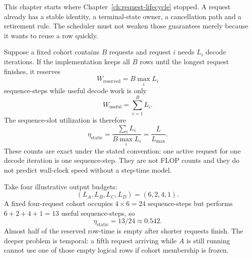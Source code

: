 This chapter starts where Chapter~\ref{ch:request-lifecycle} stopped. A request
already has a stable identity, a terminal-state owner, a cancellation path and
a retirement rule. The scheduler must not weaken those guarantees merely
because it wants to reuse a row quickly.



Suppose a fixed cohort contains $B$ requests and request $i$ needs $L_i$
decode iterations. If the implementation keeps all $B$ rows until the longest
request finishes, it reserves
\[
  W_{\mathrm{reserved}} = B\max_i L_i
\]
sequence-steps while useful decode work is only
\[
  W_{\mathrm{useful}} = \sum_{i=1}^{B} L_i .
\]
The sequence-slot utilization is therefore
\begin{equation}
  \eta_{\mathrm{static}}
  = \frac{\sum_i L_i}{B\max_i L_i}
  = \frac{\bar L}{L_{\max}} .
  \label{eq:static-occupancy}
\end{equation}
These counts are exact under the stated convention: one active request for one
decode iteration is one sequence-step. They are not FLOP counts and they do
not predict wall-clock speed without a step-time model.

Take four illustrative output budgets:
\[
  (L_A,L_B,L_C,L_D)=(6,2,4,1).
\]
A fixed four-request cohort occupies $4\times6=24$ sequence-steps but performs
$6+2+4+1=13$ useful sequence-steps, so
\[
  \eta_{\mathrm{static}}=13/24\approx0.542.
\]
Almost half of the reserved row-time is empty after shorter requests finish.
The deeper problem is temporal: a fifth request arriving while $A$ is still
running cannot use one of those empty logical rows if cohort membership is
frozen.

